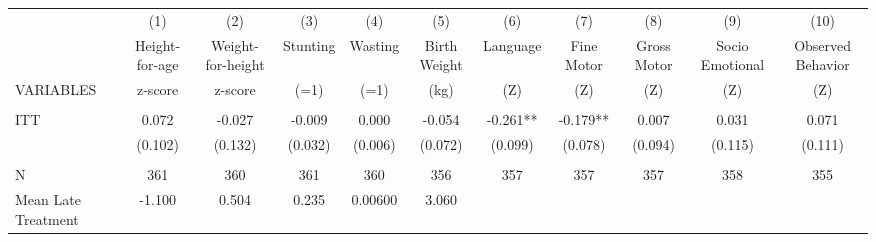 \begin{tabular}{lcccccccccc} \hline
 & (1) & (2) & (3) & (4) & (5) & (6) & (7) & (8) & (9) & (10) \\
 & Height-for-age & Weight-for-height & Stunting & Wasting & Birth Weight & Language & Fine Motor & Gross Motor & Socio Emotional & Observed Behavior \\
VARIABLES & z-score & z-score & (=1) & (=1) & (kg) & (Z) & (Z) & (Z) & (Z) & (Z) \\ \hline
 &  &  &  &  &  &  &  &  &  &  \\
ITT & 0.072 & -0.027 & -0.009 & 0.000 & -0.054 & -0.261** & -0.179** & 0.007 & 0.031 & 0.071 \\
 & (0.102) & (0.132) & (0.032) & (0.006) & (0.072) & (0.099) & (0.078) & (0.094) & (0.115) & (0.111) \\
 &  &  &  &  &  &  &  &  &  &  \\
N & 361 & 360 & 361 & 360 & 356 & 357 & 357 & 357 & 358 & 355 \\
 Mean Late Treatment & -1.100 & 0.504 & 0.235 & 0.00600 & 3.060 &  &  &  &  &  \\ \hline
\end{tabular}
